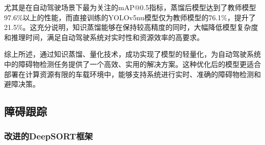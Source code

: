 \documentclass[a4paper, UTF8, fontsize=12pt]{ctexart} %
\numberwithin{equation}{section} %
\begin{document}
尤其是在自动驾驶场景下最为关注的mAP@0.5指标，蒸馏后模型达到了教师模型97.6\%以上的性能，而直接训练的YOLOv5nu模型仅为教师模型的76.1\%，提升了21.5\%。这充分说明，知识蒸馏能够在保持较高精度的同时，大幅降低模型复杂度和推理时间，满足自动驾驶系统对实时性和资源效率的高要求。


综上所述，通过知识蒸馏、量化技术，成功实现了模型的轻量化，为自动驾驶系统中的障碍物检测任务提供了一个高效、实用的解决方案。这种优化后的模型更适合部署在计算资源有限的车载环境中，能够支持系统进行实时、准确的障碍物检测和避障决策。


\subsection{障碍跟踪}
\subsubsection{改进的DeepSORT框架}
\end{document}
